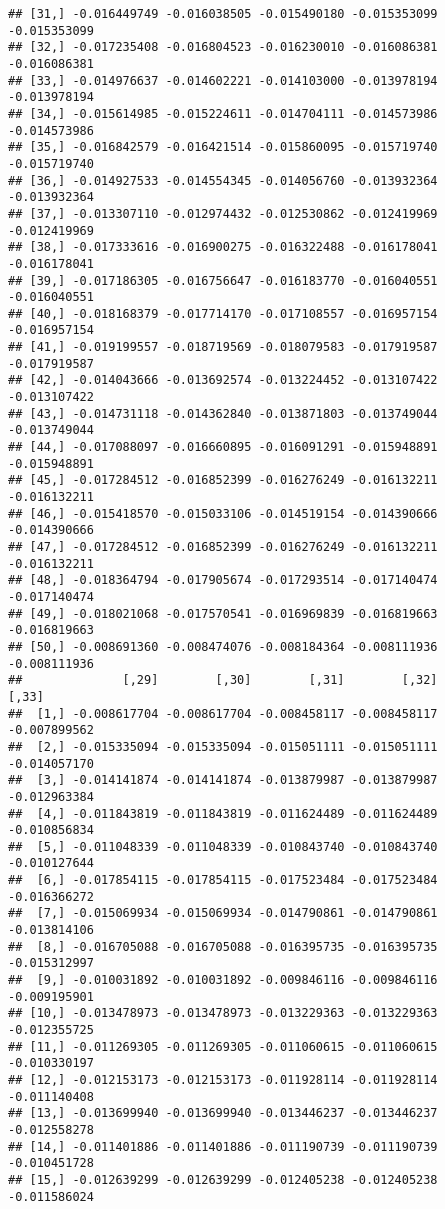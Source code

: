 \documentclass[
]{article}
\begin{document}
\begin{verbatim}
## [31,] -0.016449749 -0.016038505 -0.015490180 -0.015353099 -0.015353099
## [32,] -0.017235408 -0.016804523 -0.016230010 -0.016086381 -0.016086381
## [33,] -0.014976637 -0.014602221 -0.014103000 -0.013978194 -0.013978194
## [34,] -0.015614985 -0.015224611 -0.014704111 -0.014573986 -0.014573986
## [35,] -0.016842579 -0.016421514 -0.015860095 -0.015719740 -0.015719740
## [36,] -0.014927533 -0.014554345 -0.014056760 -0.013932364 -0.013932364
## [37,] -0.013307110 -0.012974432 -0.012530862 -0.012419969 -0.012419969
## [38,] -0.017333616 -0.016900275 -0.016322488 -0.016178041 -0.016178041
## [39,] -0.017186305 -0.016756647 -0.016183770 -0.016040551 -0.016040551
## [40,] -0.018168379 -0.017714170 -0.017108557 -0.016957154 -0.016957154
## [41,] -0.019199557 -0.018719569 -0.018079583 -0.017919587 -0.017919587
## [42,] -0.014043666 -0.013692574 -0.013224452 -0.013107422 -0.013107422
## [43,] -0.014731118 -0.014362840 -0.013871803 -0.013749044 -0.013749044
## [44,] -0.017088097 -0.016660895 -0.016091291 -0.015948891 -0.015948891
## [45,] -0.017284512 -0.016852399 -0.016276249 -0.016132211 -0.016132211
## [46,] -0.015418570 -0.015033106 -0.014519154 -0.014390666 -0.014390666
## [47,] -0.017284512 -0.016852399 -0.016276249 -0.016132211 -0.016132211
## [48,] -0.018364794 -0.017905674 -0.017293514 -0.017140474 -0.017140474
## [49,] -0.018021068 -0.017570541 -0.016969839 -0.016819663 -0.016819663
## [50,] -0.008691360 -0.008474076 -0.008184364 -0.008111936 -0.008111936
##              [,29]        [,30]        [,31]        [,32]        [,33]
##  [1,] -0.008617704 -0.008617704 -0.008458117 -0.008458117 -0.007899562
##  [2,] -0.015335094 -0.015335094 -0.015051111 -0.015051111 -0.014057170
##  [3,] -0.014141874 -0.014141874 -0.013879987 -0.013879987 -0.012963384
##  [4,] -0.011843819 -0.011843819 -0.011624489 -0.011624489 -0.010856834
##  [5,] -0.011048339 -0.011048339 -0.010843740 -0.010843740 -0.010127644
##  [6,] -0.017854115 -0.017854115 -0.017523484 -0.017523484 -0.016366272
##  [7,] -0.015069934 -0.015069934 -0.014790861 -0.014790861 -0.013814106
##  [8,] -0.016705088 -0.016705088 -0.016395735 -0.016395735 -0.015312997
##  [9,] -0.010031892 -0.010031892 -0.009846116 -0.009846116 -0.009195901
## [10,] -0.013478973 -0.013478973 -0.013229363 -0.013229363 -0.012355725
## [11,] -0.011269305 -0.011269305 -0.011060615 -0.011060615 -0.010330197
## [12,] -0.012153173 -0.012153173 -0.011928114 -0.011928114 -0.011140408
## [13,] -0.013699940 -0.013699940 -0.013446237 -0.013446237 -0.012558278
## [14,] -0.011401886 -0.011401886 -0.011190739 -0.011190739 -0.010451728
## [15,] -0.012639299 -0.012639299 -0.012405238 -0.012405238 -0.011586024

\end{verbatim}
\end{document}
